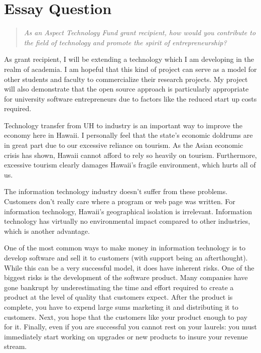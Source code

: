 
\section{Essay Question}

\begin{quote}
  {\em As an Aspect Technology Fund grant recipient, how would you contribute
    to the field of technology and promote the spirit of entrepreneurship?}
\end{quote}

As grant recipient, I will be extending a technology which I am developing in
the realm of academia. I am hopeful that this kind of project can serve as a
model for other students and faculty to commercialize their research projects.
My project will also demonstrate that the open source approach is particularly
appropriate for university software entrepreneurs due to factors like the
reduced start up costs required.

Technology transfer from UH to industry is an important way to improve the
economy here in Hawaii. I personally feel that the state's economic doldrums
are in great part due to our excessive reliance on tourism. As the Asian
economic crisis has shown, Hawaii cannot afford to rely so heavily on tourism.
Furthermore, excessive tourism clearly damages Hawaii's fragile environment,
which hurts all of us.

The information technology industry doesn't suffer from these problems.
Customers don't really care where a program or web page was written. For
information technology, Hawaii's geographical isolation is irrelevant.
Information technology has virtually no environmental impact compared to other
industries, which is another advantage.

One of the most common ways to make money in information technology is to
develop software and sell it to customers (with support being an afterthought).
While this can be a very successful model, it does have inherent risks. One of
the biggest risks is the development of the software product. Many companies
have gone bankrupt by underestimating the time and effort required to create a
product at the level of quality that customers expect. After the product is
complete, you have to expend large sums marketing it and distributing it to
customers.  Next, you hope that the customers like your product enough to pay
for it.  Finally, even if you are successful you cannot rest on your laurels:
you must immediately start working on upgrades or new products to insure your
revenue stream.

